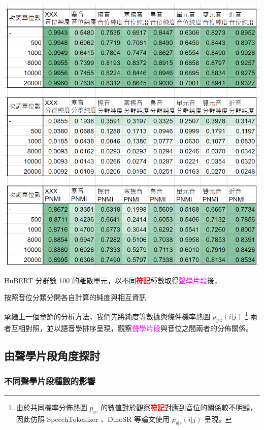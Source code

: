 {{        \begin{table}
            \centering
            \includegraphics[width=1\linewidth]{figures/ch4figs/hub100-ap-detailedpur.png}
            \caption{HuBERT 分群數 100 的離散單元，以不同\textbf{\textcolor{red}{符記}}種數取得\textcolor{magenta}{聲學片段}後，}
            按照音位分類分開各自計算的純度與相互資訊
            \label{tabfig:hub100-ap-detailedpur}
        \end{table}
    }
  }  %

        承繼上一個章節的分析方法，我們先將純度等數據與條件機率熱圖 $p_{y|z}(i | j)$ \footnote{由於共同機率分佈熱圖 $p_{yz}$ 的數值對於觀察\textbf{\textcolor{red}{符記}}對應到音位的關係較不明顯，因此仿照 SpeechTokenizer \cite{zhang2024speechtokenizer}、DinoSR \cite{liu2024dinosr} 等論文使用 $p_{y|z}(i | j)$ 呈現。} 兩者互相對照，並以語音學排序呈現，觀察\textcolor{magenta}{聲學片段}與音位之間兩者的分佈關係。

\subsection{由聲學片段角度探討}

\subsubsection{不同聲學片段種數的影響}

